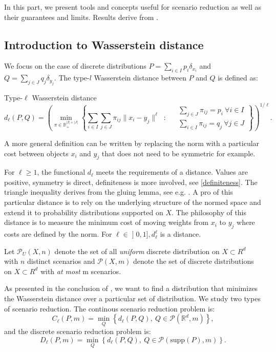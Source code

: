 \documentclass{amsart}
\begin{document}
In this part, we present tools and concepts useful for scenario reduction as well as their guarantees and limits. Results derive from \cite{rujeerapaiboon_scenario_2022}. 

\subsection{Introduction to Wasserstein distance}
We focus on the case of discrete distributions $P=\sum_{i\in I}p_i\delta_{x_i}$ and $Q=\sum_{j\in J}q_j\delta_{y_j}$. The type-$l$ Wasserstein distance between $P$ and $Q$ is defined as:  
\begin{definition}{Type-$\ell$ Wasserstein distance}
$$
d_\ell(P,Q)=\left(\min_{\pi\in\mathbb{R}_+^{\lvert I\rvert\times\lvert J\rvert}}\left\{ 
\sum_{i\in I}\sum_{j\in J}\pi_{ij}\lVert x_i-y_j\rVert^\ell \: \text{ : } \:  \begin{aligned}
& \sum_{j\in J}\pi_{ij}=p_i \: \forall i\in I \\
& \sum_{i\in I}\pi_{ij}=q_j \: \forall j\in J
\end{aligned}\right\}\right)^{1/\ell}.
$$
\end{definition}

\begin{remark}
    A more general definition can be written by replacing the norm with a particular cost between objects $x_i$ and $y_j$ that does not need to be symmetric for example. 
\end{remark}
For $\ell\geq1$, the functional $d_\ell$ meets the requirements of a distance. Values are positive, symmetry is direct, definiteness is more involved, see \ref{definiteness}. The triangle inequality derives from the gluing lemma, see e.g. \cite[Chapter 1]{peyre_computational_2019}. A pro of this particular distance is to rely on the underlying structure of the normed space and extend it to probability distributions supported on $X$. The philosophy of this distance is to measure the minimum cost of moving weights from $x_i$ to $y_j$ where costs are defined by the norm. For $\ell\in\mathopen{]}0,1\mathclose{]}, d_\ell^\ell$ is a distance.
\newline

Let $\mathcal{P}_U(X,n)$ denote the set of all \emph{uniform} discrete distribution on $X\subset R^d$ with $n$ distinct scenarios and $\mathcal{P}(X,m)$ denote the set of discrete distributions on $X\subset R^d$ with \emph{at most} m scenarios. 
\newline

As presented in the conclusion of , we want to find a distribution that minimizes the Wasserstein distance over a particular set of distribution. We study two types of scenario reduction. The continous scenario reduction problem is:
$$
C_\ell(P,m)=\min_Q\left\{d_\ell(P,Q),\: Q\in\mathcal{P}\left(\mathbb{R}^d,m\right)\right\}, 
$$
and the discrete scenario reduction problem is:
$$
D_\ell(P,m)=\min_Q\left\{d_\ell(P,Q),\: Q\in\mathcal{P}(\text{supp}\left(P\right),m)\right\}.
$$
\end{document}
